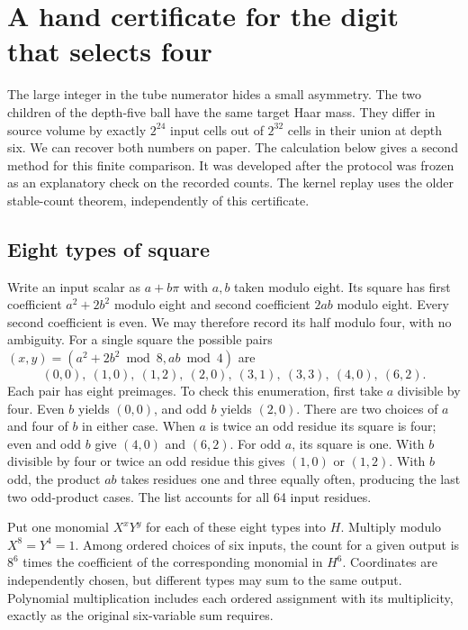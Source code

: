 \documentclass[12pt,letterpaper]{article}
\begin{document}
\section{A hand certificate for the digit that selects four}
The large integer in the tube numerator hides a small asymmetry. The two children of the depth-five ball have the same target Haar mass. They differ in source volume by exactly $2^{24}$ input cells out of $2^{32}$ cells in their union at depth six. We can recover both numbers on paper. The calculation below gives a second method for this finite comparison. It was developed after the protocol was frozen as an explanatory check on the recorded counts. The kernel replay uses the older stable-count theorem, independently of this certificate.

\subsection{Eight types of square}
Write an input scalar as $a+b\pi$ with $a,b$ taken modulo eight. Its square has first coefficient $a^2+2b^2$ modulo eight and second coefficient $2ab$ modulo eight. Every second coefficient is even. We may therefore record its half modulo four, with no ambiguity. For a single square the possible pairs $(x,y)=(a^2+2b^2\bmod 8,ab\bmod4)$ are
\[
 (0,0),\ (1,0),\ (1,2),\ (2,0),\ (3,1),\ (3,3),\ (4,0),\ (6,2).
\]
Each pair has eight preimages. To check this enumeration, first take $a$ divisible by four. Even $b$ yields $(0,0)$, and odd $b$ yields $(2,0)$. There are two choices of $a$ and four of $b$ in either case. When $a$ is twice an odd residue its square is four; even and odd $b$ give $(4,0)$ and $(6,2)$. For odd $a$, its square is one. With $b$ divisible by four or twice an odd residue this gives $(1,0)$ or $(1,2)$. With $b$ odd, the product $ab$ takes residues one and three equally often, producing the last two odd-product cases. The list accounts for all 64 input residues.

Put one monomial $X^xY^y$ for each of these eight types into $H$. Multiply modulo $X^8=Y^4=1$. Among ordered choices of six inputs, the count for a given output is $8^6$ times the coefficient of the corresponding monomial in $H^6$. Coordinates are independently chosen, but different types may sum to the same output. Polynomial multiplication includes each ordered assignment with its multiplicity, exactly as the original six-variable sum requires.
\end{document}
